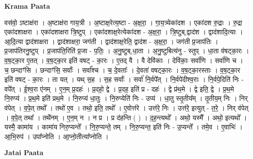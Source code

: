 \documentclass[17pt]{extarticle}
\begin{document}
\textbf{Krama Paata} \newline

वस॑वो॒ ऽष्टाक्ष॑रा । अ॒ष्टाक्ष॑रा गाय॒त्री । अ॒ष्टाक्ष॒रेत्य॒ष्टा - अ॒क्ष॒रा॒ । गा॒य॒त्र्येका॑दश । एका॑दश रु॒द्राः । रु॒द्रा एका॑दशाक्षरा । एका॑दशाक्षरा त्रि॒ष्टुप् । एका॑दशाक्ष॒रेत्येका॑दश - अ॒क्ष॒रा॒ । त्रि॒ष्टुब्,द्वाद॑श । द्वाद॑शादि॒त्याः । आ॒दि॒त्या द्वाद॑शाक्षरा । द्वाद॑शाक्षरा॒ जग॑ती । द्वाद॑शाक्ष॒रेति॒ द्वाद॑श - अ॒क्ष॒रा॒ । जग॑ती प्र॒जाप॑तिः । प्र॒जाप॑तिरनु॒ष्टुप् । प्र॒जाप॑ति॒रिति॑ प्र॒जा - प॒तिः॒ । अ॒नु॒ष्टुब्,धा॒ता । अ॒नु॒ष्टुबित्य॑नु - स्तुप् । धा॒ता व॑षट्का॒रः । व॒ष॒ट्का॒र ए॒तत् । व॒ष॒ट्का॒र इति॑ वषट् - का॒रः । ए॒तद् वै । वै देवि॑काः । देवि॑काः॒ सर्वा॑णि । सर्वा॑णि च । च॒ छन्दाꣳ॑सि । छन्दाꣳ॑सि॒ सर्वाः᳚ । सर्वा᳚श्च । च॒ दे॒वताः᳚ । दे॒वता॑ वषट्का॒रः । व॒ष॒ट्का॒रस्ताः । व॒ष॒ट्का॒र इति॑ वषट् - का॒रः । ता यत् । यथ् स॒ह । स॒ह सर्वाः᳚ । सर्वा॑ नि॒र्वपे᳚त् । नि॒र्वपे॑दीश्व॒राः । नि॒र्वपे॒दिति॑ निः - वपे᳚त् । ई॒श्व॒रा ए॑नम् । ए॒न॒म् प्र॒दहः॑ । प्र॒दहो॒ द्वे । प्र॒दह॒ इति॑ प्र - दहः॑ । द्वे प्र॑थ॒मे । द्वे इति॒ द्वे । प्र॒थ॒मे नि॒रुप्य॑ । प्र॒थ॒मे इति॑ प्रथ॒मे । नि॒रुप्य॑ धा॒तुः । नि॒रुप्येति॑ निः - उप्य॑ । धा॒तु स्तृ॒तीय᳚म् । तृ॒तीय॒म् निः । निर् व॑पेत् । व॒पे॒त् तथो᳚ । तथो॑ ए॒व । तथो॒ इति॒ तथो᳚ । ए॒वोत्त॑रे । उत्त॑रे॒ निः । उत्त॑रे॒ इत्युत् - त॒रे॒ । निर् व॑पेत् । व॒पे॒त् तथा᳚ । तथै॑नम् । ए॒न॒म् न । न प्र । प्र द॑हन्ति ( ) । द॒ह॒न्त्यथो᳚ । अथो॒ यस्मै᳚ । अथो॒ इत्यथो᳚ । यस्मै॒ कामा॑य । कामा॑य निरु॒प्यन्ते᳚ । नि॒रु॒प्यन्ते॒ तम् । नि॒रु॒प्यन्त॒ इति॑ निः - उ॒प्यन्ते᳚ । तमे॒व । ए॒वाभिः॑ । आ॒भि॒रुप॑ । उपा᳚प्नोति । आ॒प्नो॒तीत्या᳚प्नोति । \newline

\textbf{Jatai Paata} \newline
\end{document}
